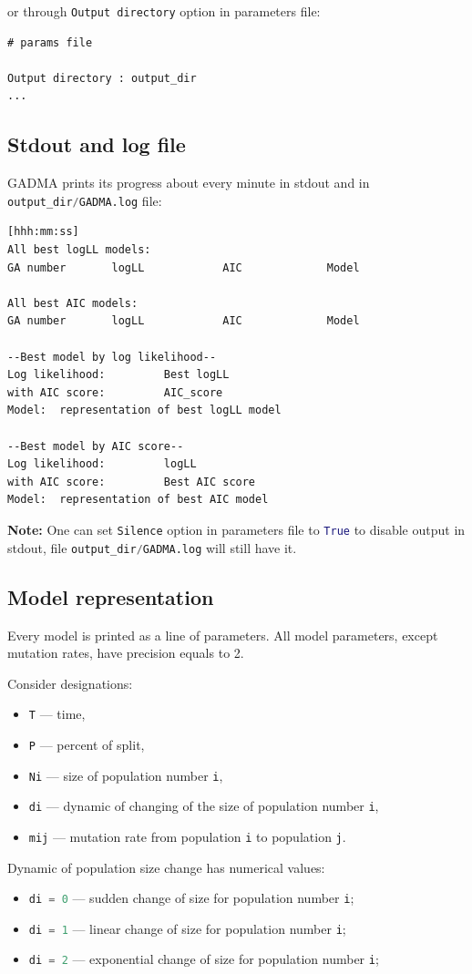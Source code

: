 \documentclass[12pt]{article}
\makeatletter
\newcommand{\py}[1]{\lstinline[language=Python, showstringspaces=False]@#1@}
\makeatother
\begin{document}
or through \py{Output directory} option in parameters file:
\begin{lstlisting}
# params file

Output directory : output_dir
...
\end{lstlisting}

\subsection{Stdout and log file}
GADMA prints its progress about every minute in stdout and in \py{output_dir/GADMA.log} file:

\begin{lstlisting}
[hhh:mm:ss]
All best logLL models:
GA number       logLL            AIC             Model

All best AIC models:
GA number       logLL            AIC             Model

--Best model by log likelihood--
Log likelihood:       	Best logLL
with AIC score:         AIC_score
Model: 	representation of best logLL model

--Best model by AIC score--
Log likelihood:       	logLL
with AIC score:         Best AIC score
Model:  representation of best AIC model 
\end{lstlisting}
 
\textbf{Note: } One can set \py{Silence} option in parameters file to \py{True} to disable output in stdout, file \py{output_dir/GADMA.log} will still have it.

\subsection{Model representation}
Every model is printed as a line of parameters. All model parameters, except mutation rates, have precision equals to 2.

Consider designations:
\begin{itemize}
    \item \py{T} --- time,
    \item \py{P} --- percent of split,
    \item \py{Ni} --- size of population number \py{i},
    \item \py{di} --- dynamic of changing of the size of population number \py{i},
    \item \py{mij} --- mutation rate from population \py{i} to population \py{j}.
\end{itemize}

Dynamic of population size change has numerical values: 
\begin{itemize}
    \item \py{di = 0} --- sudden change of size for population number \py{i};
    \item \py{di = 1} --- linear change of size for population number \py{i};
    \item \py{di = 2} --- exponential change of size for population number \py{i};
\end{itemize}
\end{document}
